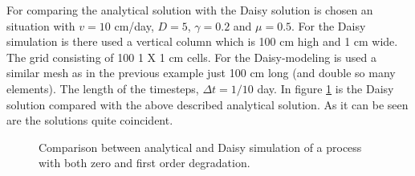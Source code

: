 \documentclass{report}
\begin{document}
For comparing the analytical solution with the Daisy solution is
chosen an situation with $v=10$ cm/day, $D=5$, $\gamma=0.2$
and $\mu=0.5$. For the Daisy simulation is there used a vertical
column which is 100 cm high and 1 cm wide. The grid consisting of
100 1 X 1 cm cells. For the Daisy-modeling is used a similar mesh
as in the previous example just 100 cm long (and double so many
elements). The length of the timesteps, $\Delta t=1/10$ day. In
figure \ref{fig:solanalyt} is the Daisy solution compared with the
above described analytical solution. As it can be seen are the
solutions quite coincident.

\begin{figure}[h!]  %
\begin{center}
\caption{Comparison between analytical and Daisy simulation of a
process with both zero and first order degradation.}
\label{fig:solanalyt}
\end{center}
\end{figure}





%
%



%
%
%




%
%


%


\end{document}
